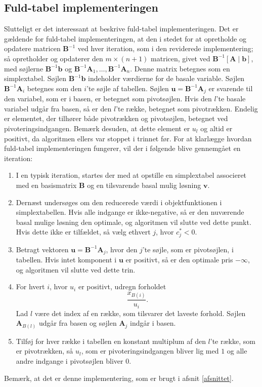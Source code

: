 \subsection{Fuld-tabel implementeringen}
Slutteligt er det interessant at beskrive fuld-tabel implementeringen. 
Det er gældende for fuld-tabel implementeringen, at den i stedet for at opretholde og opdatere matricen $\mathbf{B}^{-1}$ ved hver iteration, som i den reviderede implementering; så opretholder og opdaterer den $m \times (n+1)$ matricen, givet ved $\mathbf{B}^{-1} \left [ \mathbf{A} \mid \mathbf{b} \right ]$, med søjlerne $\mathbf{B}^{-1}\mathbf{b}$ og $\mathbf{B}^{-1}\mathbf{A}_1,\ldots,\mathbf{B}^{-1}\mathbf{A}_n$. 
Denne matrix betegnes som en simplextabel.
Søjlen $\mathbf{B}^{-1}\mathbf{b}$ indeholder værdierne for de basale variable.
Søjlen $\mathbf{B}^{-1}\mathbf{A}_i$ betegnes som den $i$'te søjle af tabellen.
Søjlen $\mathbf{u} = \mathbf{B}^{-1}\mathbf{A}_j$ er svarende til den variabel, som er i basen, er betegnet som pivotsøjlen. 
Hvis den $l$'te basale variabel udgår fra basen, så er den $l$'te række, betegnet som pivotrækken. 
Endelig er elementet, der tilhører både pivotrækken og pivotsøjlen, betegnet ved pivoteringsindgangen.
Bemærk desuden, at dette element er $u_l$ og altid er positivt, da algoritmen ellers var stoppet i trinnet før. 
For at klarlægge hvordan fuld-tabel implementeringen fungerer, vil der i følgende blive gennemgået en iteration: 
%
\begin{tcolorbox}[
title=Fuld-tabel implementering,
colback		= myblue!15,
colframe	= myblue!15,
coltitle	= black,
before skip	= 20pt plus 2pt,
after skip	= 20pt plus 2pt,
fonttitle	= \bfseries]
\begin{enumerate}
\item I en typisk iteration, startes der med at opstille en simplextabel associeret med en basismatrix $\mathbf{B}$ og en tilsvarende basal mulig løsning $\mathbf{v}.$
\item Dernæst undersøges om den reducerede værdi i objektfunktionen i simplextabellen.
Hvis alle indgange er ikke-negative, så er den nuværende basal mulige løsning den optimale, og algoritmen vil slutte ved dette punkt.
Hvis dette ikke er tilfældet, så vælg ethvert $j$, hvor $c_j^* < 0$.
\item Betragt vektoren $\mathbf{u}=\mathbf{B}^{-1}\mathbf{A}_j$, hvor den $j$'te søjle, som er pivotsøjlen, i tabellen. Hvis intet komponent i $\mathbf{u}$ er positivt, så er den optimale pris $-\infty$, og algoritmen vil slutte ved dette trin. 
\item For hvert $i$, hvor $u_i$ er positivt, udregn forholdet $$\frac{x_{B(i)}}{u_i}.$$ Lad $l$ være det index  af en række, som tilsvarer det laveste forhold.
Søjlen $\mathbf{A}_{B(l)}$ udgår fra basen og søjlen $\mathbf{A}_j$ indgår i basen. 
\item Tilføj for hver række i tabellen en konstant multiplum af den $l$'te række, som er pivotrækken, så $u_l$, som er pivoteringsindgangen bliver lig med $1$ og alle andre indgange i pivotsøjlen bliver $0$. 
\end{enumerate}
\end{tcolorbox}
\noindent
%
Bemærk, at det er denne implementering, som er brugt i afsnit \ref{afsnittet}.